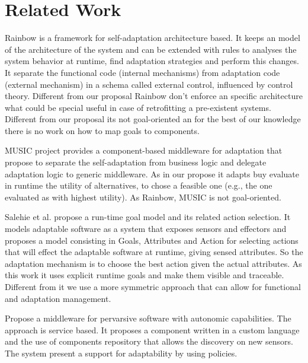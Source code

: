 \section{Related Work}
\label{related}


Rainbow is a framework for self-adaptation architecture based\cite{garlan_rainbow:_2004}. It keeps an model of the architecture of the system and can be extended with rules to analyses the system behavior at runtime, find adaptation strategies and perform this changes. It separate the functional  code (internal mechanisms) from adaptation code (external mechanism) in a schema called external control, influenced by control theory. \cite{garlan_software_2009}
Different from our proposal Rainbow don't enforce an specific architecture what could be special useful in case of retrofitting a pre-existent systems. Different from our proposal its not goal-oriented an for the best of our knowledge there is no work on how to map goals to  components.

MUSIC project provides a component-based middleware for adaptation that propose to separate the self-adaptation from business logic and delegate adaptation logic to generic middleware. As in our propose it adapts buy evaluate in runtime the utility of alternatives, to chose a feasible one (e.g., the one evaluated as with highest utility)\cite{rouvoy_music:_2009}. As Rainbow, MUSIC is not goal-oriented.

Salehie et al. \cite{salehie_towards_2012} propose a run-time goal model and its related
action selection. It models adaptable software as a system that exposes sensors and effectors and  proposes a model consisting in Goals, Attributes and Action for selecting actions that will effect the adaptable software at runtime, giving sensed attributes.
So the adaptation mechanism is to choose the best action given the actual attributes.
As this work it uses explicit runtime goals and make them visible and traceable.
Different from it we use a more symmetric approach that can allow for functional
and adaptation management.

\cite{gunalp_autonomic_2012} Propose a middleware for pervarsive software with autonomic capabilities. The approach is service based. It proposes a component written in a custom language and the use of components repository that allows the discovery on new sensors. The system present a support for adaptability by using policies.

